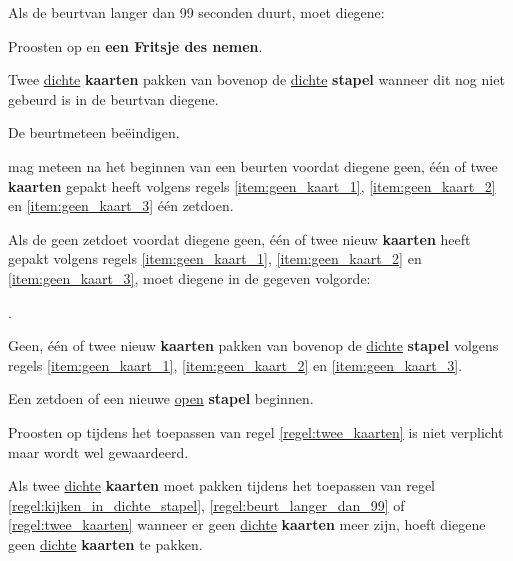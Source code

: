 \vervolgLijst{}
\item Als de beurt\footnotemark[1] van \eenSpeler langer dan 99 seconden duurt, moet diegene:
\puntLijst{}
\item Proosten op  en \textbf{een Fritsje des nemen}\footnotemark[2].
\item Twee \ul{dichte} \textbf{kaarten} pakken van bovenop de \ul{dichte} \textbf{stapel} wanneer dit nog niet gebeurd is in de beurt\footnotemark[1] van diegene.
\item De beurt\footnotemark[1] meteen beëindigen.
\eindPuntLijst{}
\label{regel:beurt_langer_dan_99}
\eindLijst{}


\vervolgLijst{}
\item \EenSpeler mag meteen na het beginnen van een beurt\footnotemark[1] en voordat diegene geen, \'e\'en of twee \textbf{kaarten} gepakt heeft volgens regels \ref{item:geen_kaart_1}, \ref{item:geen_kaart_2} en \ref{item:geen_kaart_3} \'e\'en zet\footnotemark[3] doen.
\label{regel:zet_zonder_pakker}
\eindLijst{}

\vervolgLijst{}
\item \label{regel:twee_kaarten} Als de \huidigeSpeler geen zet\footnotemark[3] doet voordat diegene geen, \'e\'en of twee nieuw \textbf{kaarten} heeft gepakt volgens regels \ref{item:geen_kaart_1}, \ref{item:geen_kaart_2} en \ref{item:geen_kaart_3}, moet diegene in de gegeven volgorde:
\puntLijst{}
\item \FritsenN\footnotemark[4].
\item Geen, \'e\'en of twee nieuw \textbf{kaarten} pakken van bovenop de \ul{dichte} \textbf{stapel} volgens regels \ref{item:geen_kaart_1}, \ref{item:geen_kaart_2} en \ref{item:geen_kaart_3}.
\item Een zet\footnotemark[3] doen of een nieuwe \ul{open} \textbf{stapel} beginnen.
\eindPuntLijst{}
\label{regel:fritsen_en_kaarten_pakken}
\eindLijst{}

\vervolgLijst{}
\item Proosten op  tijdens het toepassen van regel \ref{regel:twee_kaarten} is niet verplicht maar wordt wel gewaardeerd.
\eindLijst{}

\vervolgLijst{}
\item Als \eenSpeler twee \ul{dichte} \textbf{kaarten} moet pakken tijdens het toepassen van regel \ref{regel:kijken_in_dichte_stapel}, \ref{regel:beurt_langer_dan_99} of \ref{regel:twee_kaarten} wanneer er geen \ul{dichte} \textbf{kaarten} meer zijn, hoeft diegene geen \ul{dichte} \textbf{kaarten} te pakken.
\label{item:geen_kaart_1}
\eindLijst{}

